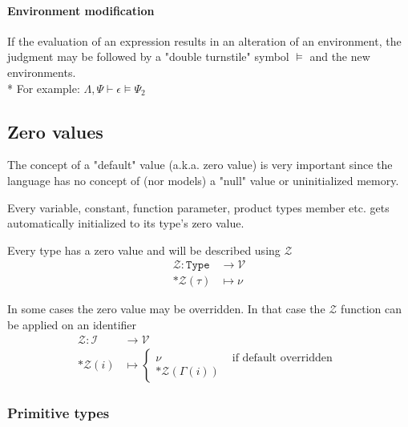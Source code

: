\documentclass[11pt]{report}
\newcommand{\then}{\vdash}
\newcommand{\Then}{\vDash}
\newcommand{\expr}{\epsilon}
\newcommand{\val}{\nu}
\newcommand{\Id}{\mathcal{I}}
\newcommand{\Val}{\mathcal{V}}
\newcommand{\Zero}{\mathcal{Z}}
\newcommand{\Type}{\texttt{Type}}
\newcommand{\Env}{\Gamma}
\newcommand{\EnvLoc}{\Lambda}
\newcommand{\EnvStore}{\Psi}
\theoremstyle{definition}
\begin{document}

\paragraph{Environment modification} If the evaluation of an expression
results in an alteration of an environment, the judgment may be followed by a
"double turnstile" symbol $\Then$ and the new environments.\\*
For example: $\EnvLoc,\EnvStore \then \expr \Then \EnvStore_2$

\newpage

\subsection{Zero values}

The concept of a "default" value (a.k.a. zero value) is very important since
the language has no concept of (nor models) a "null" value or uninitialized
memory.

Every variable, constant, function parameter, product types member etc. gets
automatically initialized to its type's zero value.

Every type has a zero value and will be described using $\Zero$
\[
	\begin{split}
		\Zero : \Type &\to \Val \\*
		\Zero(\tau)   &\mapsto \val
	\end{split}
\]

In some cases the zero value may be overridden. In that case the $\Zero$
function can be applied on an identifier
\[
	\begin{split}
		\Zero : \Id &\to \Val \\*
		\Zero(i) &\mapsto \begin{cases}
			\val             &\text{ if default overridden } \\*
			\Zero(\Env(i)) &
		\end{cases}
	\end{split}
\]

\subsubsection{Primitive types}
\end{document}
